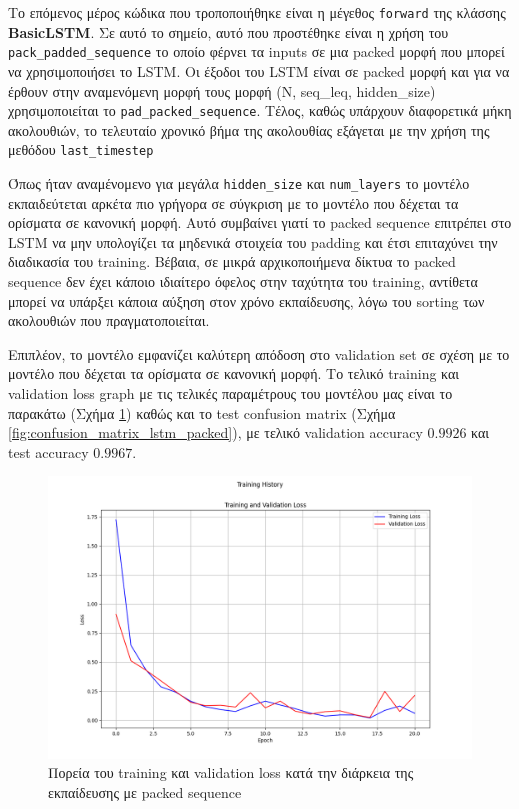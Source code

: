 \documentclass[a4paper,12pt]{article}
\begin{document}
Το επόμενος μέρος κώδικα που τροποποιήθηκε είναι η μέγεθος
\texttt{forward} της κλάσσης \textbf{BasicLSTM}. Σε αυτό το σημείο, αυτό που
προστέθηκε είναι η χρήση του \texttt{pack\_padded\_sequence} το οποίο
φέρνει τα inputs σε μια packed μορφή που μπορεί να
χρησιμοποιήσει το LSTM. Οι έξοδοι του LSTM είναι σε packed μορφή
και για να έρθουν στην αναμενόμενη μορφή τους μορφή
(N, seq\_leq, hidden\_size) χρησιμοποιείται το \texttt{pad\_packed\_sequence}.
Τέλος, καθώς υπάρχουν διαφορετικά μήκη ακολουθιών,
το τελευταίο χρονικό βήμα της ακολουθίας εξάγεται με την
χρήση της μεθόδου \texttt{last\_timestep}

Όπως ήταν αναμένομενο για μεγάλα \texttt{hidden\_size} και \texttt{num\_layers} το μοντέλο
εκπαιδεύτεται αρκέτα πιο γρήγορα σε σύγκριση με το μοντέλο που δέχεται
τα ορίσματα σε κανονική μορφή. Αυτό συμβαίνει γιατί το packed sequence
επιτρέπει στο LSTM να μην υπολογίζει τα μηδενικά στοιχεία του padding
και έτσι επιταχύνει την διαδικασία του training. Βέβαια, σε μικρά αρχικοποιήμενα
δίκτυα το packed sequence δεν έχει κάποιο ιδιαίτερο όφελος
στην ταχύτητα του training, αντίθετα μπορεί να υπάρξει κάποια αύξηση
στον χρόνο εκπαίδευσης, λόγω του sorting των ακολουθιών που
πραγματοποιείται.

Επιπλέον, το μοντέλο εμφανίζει καλύτερη απόδοση στο validation set σε σχέση με το μοντέλο
που δέχεται τα ορίσματα σε κανονική μορφή. Το τελικό training και validation loss graph
με τις τελικές παραμέτρους του μοντέλου μας είναι το παρακάτω (Σχήμα \ref{fig:tr_val_loss_plot_lstm_packed})
καθώς και το test confusion matrix (Σχήμα \ref{fig:confusion_matrix_lstm_packed}), με τελικό validation 
accuracy $0.9926$ και test accuracy $0.9967$.

\begin{figure}[ht]
    \centering
    \includegraphics[width=\textwidth]{tr_val_loss_lstm_packed.png}
    \caption{Πορεία του training και validation loss κατά την διάρκεια της εκπαίδευσης με packed sequence}
    \label{fig:tr_val_loss_plot_lstm_packed}
\end{figure}
\end{document}
